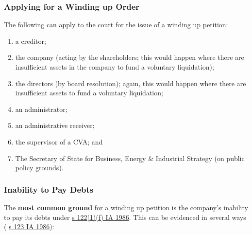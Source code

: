 \documentclass[
]{article}
\providecommand{\tightlist}{%
  \setlength{\itemsep}{0pt}\setlength{\parskip}{0pt}}
\begin{document}
\hypertarget{applying-for-a-winding-up-order}{%
\subsubsection{Applying for a Winding up
Order}\label{applying-for-a-winding-up-order}}

The following can apply to the court for the issue of a winding up
petition:

\begin{enumerate}
\tightlist
\item
  a creditor;
\item
  the company (acting by the shareholders; this would happen where there
  are insufficient assets in the company to fund a voluntary
  liquidation);
\item
  the directors (by board resolution); again, this would happen where
  there are insufficient assets to fund a voluntary liquidation;
\item
  an administrator;
\item
  an administrative receiver;
\item
  the supervisor of a CVA; and
\item
  The Secretary of State for Business, Energy \& Industrial Strategy (on
  public policy grounds).
\end{enumerate}

\hypertarget{inability-to-pay-debts}{%
\subsubsection{Inability to Pay Debts}\label{inability-to-pay-debts}}

The \textbf{most common ground} for a winding up petition is the
company's inability to pay its debts under
\href{https://www.legislation.gov.uk/ukpga/1986/45/section/122}{s
122(1)(f) IA 1986}. This can be evidenced in several ways (
\href{https://www.legislation.gov.uk/ukpga/1986/45/section/123}{s 123 IA
1986}):
\end{document}
